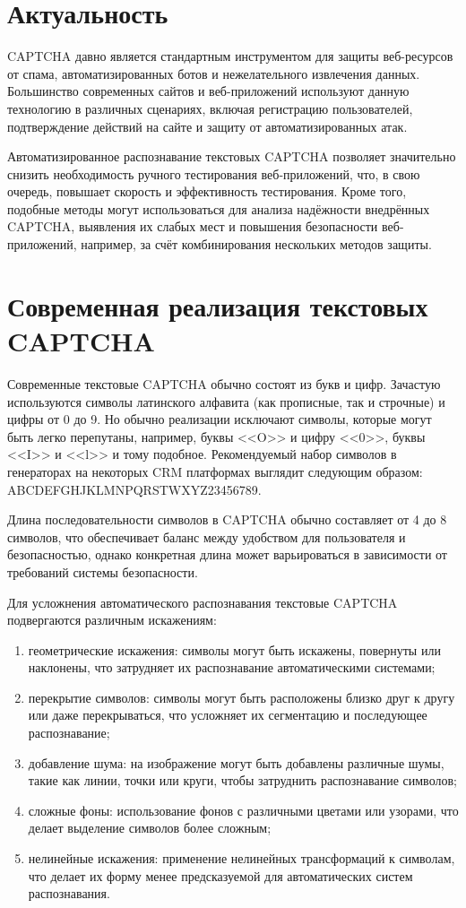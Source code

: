 \documentclass{altsu-report}
\begin{document}
\section*{Актуальность}

CAPTCHA давно является стандартным инструментом для защиты веб-ресурсов от спама, автоматизированных ботов и нежелательного извлечения данных. Большинство современных сайтов и веб-приложений используют данную технологию в различных сценариях, включая регистрацию пользователей, подтверждение действий на сайте и защиту от автоматизированных атак.

Автоматизированное распознавание текстовых CAPTCHA позволяет значительно снизить необходимость ручного тестирования веб-приложений, что, в свою очередь, повышает скорость и эффективность тестирования. Кроме того, подобные методы могут использоваться для анализа надёжности внедрённых CAPTCHA, выявления их слабых мест и повышения безопасности веб-приложений, например, за счёт комбинирования нескольких методов защиты.

\section*{Современная реализация текстовых CAPTCHA}

Современные текстовые CAPTCHA обычно состоят из букв и цифр. Зачастую используются символы латинского алфавита (как прописные, так и строчные) и цифры от 0 до 9. Но обычно реализации исключают символы, которые могут быть легко перепутаны, например, буквы <<O>> и цифру <<0>>, буквы <<I>> и <<l>> и тому подобное. Рекомендуемый набор символов в генераторах на некоторых CRM платформах выглядит следующим образом: ABCDEFGHJKLMNPQRSTWXYZ23456789.

Длина последовательности символов в CAPTCHA обычно составляет от 4 до 8 символов, что обеспечивает баланс между удобством для пользователя и безопасностью, однако конкретная длина может варьироваться в зависимости от требований системы безопасности.

Для усложнения автоматического распознавания текстовые CAPTCHA подвергаются различным искажениям:
\begin{enumerate}
    \item геометрические искажения: символы могут быть искажены, повернуты или наклонены, что затрудняет их распознавание автоматическими системами;
    \item перекрытие символов: символы могут быть расположены близко друг к другу или даже перекрываться, что усложняет их сегментацию и последующее распознавание;
    \item добавление шума: на изображение могут быть добавлены различные шумы, такие как линии, точки или круги, чтобы затруднить распознавание символов;
    \item сложные фоны: использование фонов с различными цветами или узорами, что делает выделение символов более сложным;
    \item нелинейные искажения: применение нелинейных трансформаций к символам, что делает их форму менее предсказуемой для автоматических систем распознавания.
\end{enumerate}
\end{document}
